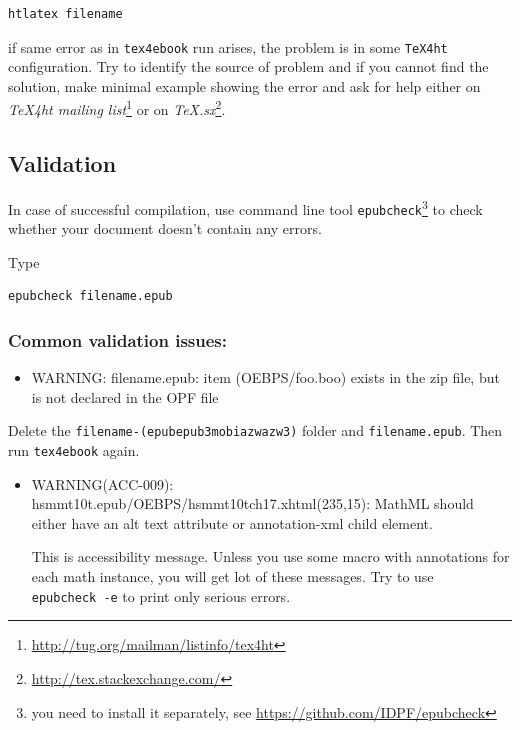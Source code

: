 \begin{verbatim}
htlatex filename 
\end{verbatim}

if same error as in \texttt{tex4ebook} run arises, the problem is in
some \texttt{TeX4ht} configuration. Try to identify the source of
problem and if you cannot find the solution, make minimal example
showing the error and ask for help either on \emph{TeX4ht mailing
list}\footnote{\url{http://tug.org/mailman/listinfo/tex4ht}} or on
\emph{TeX.sx}\footnote{\url{http://tex.stackexchange.com/}}.

\subsection{Validation}\label{validation}

In case of successful compilation, use command line tool
\texttt{epubcheck}\footnote{you need to install it separately, see
  \url{https://github.com/IDPF/epubcheck}} to check whether your
document doesn't contain any errors.

Type

\begin{verbatim}
epubcheck filename.epub
\end{verbatim}

\subsubsection{Common validation
issues:}\label{common-validation-issues}

\begin{itemize}
\tightlist
\item
  WARNING: filename.epub: item (OEBPS/foo.boo) exists in the zip file,
  but is not declared in the OPF file
\end{itemize}

Delete the
\texttt{filename-(epub\textbar{}epub3\textbar{}mobi\textbar{}azw\textbar{}azw3)}
folder and \texttt{filename.epub}. Then run \texttt{tex4ebook} again.

\begin{itemize}
\item
  WARNING(ACC-009): hsmmt10t.epub/OEBPS/hsmmt10tch17.xhtml(235,15):
  MathML should either have an alt text attribute or annotation-xml
  child element.

  This is accessibility message. Unless you use some macro with
  annotations for each math instance, you will get lot of these
  messages. Try to use \texttt{epubcheck\ -e} to print only serious
  errors.
\end{itemize}
